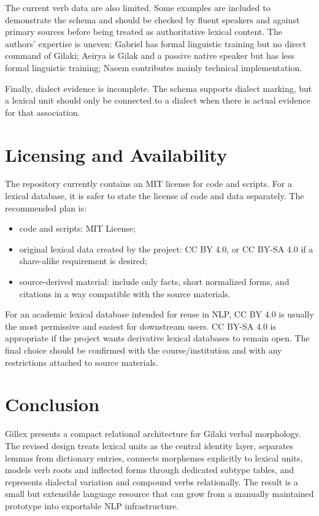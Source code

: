 \documentclass[11pt]{article}
\begin{document}
The current verb data are also limited. Some examples are included to demonstrate the schema and should be checked by fluent speakers and against primary sources before being treated as authoritative lexical content. The authors' expertise is uneven: Gabriel has formal linguistic training but no direct command of Gilaki; Aeirya is Gilak and a passive native speaker but has less formal linguistic training; Naeem contributes mainly technical implementation.

Finally, dialect evidence is incomplete. The schema supports dialect marking, but a lexical unit should only be connected to a dialect when there is actual evidence for that association.

\section{Licensing and Availability}

The repository currently contains an MIT license for code and scripts. For a lexical database, it is safer to state the license of code and data separately. The recommended plan is:
\begin{itemize}
    \item code and scripts: MIT License;
    \item original lexical data created by the project: CC BY 4.0, or CC BY-SA 4.0 if a share-alike requirement is desired;
    \item source-derived material: include only facts, short normalized forms, and citations in a way compatible with the source materials.
\end{itemize}

For an academic lexical database intended for reuse in NLP, CC BY 4.0 is usually the most permissive and easiest for downstream users. CC BY-SA 4.0 is appropriate if the project wants derivative lexical databases to remain open. The final choice should be confirmed with the course/institution and with any restrictions attached to source materials.

\section{Conclusion}

Gillex presents a compact relational architecture for Gilaki verbal morphology. The revised design treats lexical units as the central identity layer, separates lemmas from dictionary entries, connects morphemes explicitly to lexical units, models verb roots and inflected forms through dedicated subtype tables, and represents dialectal variation and compound verbs relationally. The result is a small but extensible language resource that can grow from a manually maintained prototype into exportable NLP infrastructure.



\end{document}
